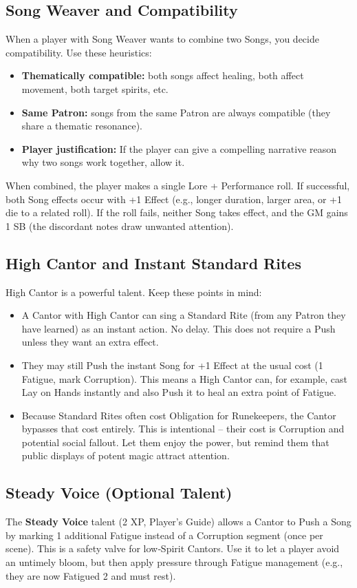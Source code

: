 \subsection*{Song Weaver and Compatibility}
\label{subsec:song-weaver-gm}
When a player with Song Weaver wants to combine two Songs, you decide compatibility. Use these heuristics:
\begin{itemize}
  \item \textbf{Thematically compatible:} both songs affect healing, both affect movement, both target spirits, etc.
  \item \textbf{Same Patron:} songs from the same Patron are always compatible (they share a thematic resonance).
  \item \textbf{Player justification:} If the player can give a compelling narrative reason why two songs work together, allow it.
\end{itemize}
When combined, the player makes a single Lore + Performance roll. If successful, both Song effects occur with +1 Effect (e.g., longer duration, larger area, or +1 die to a related roll). If the roll fails, neither Song takes effect, and the GM gains 1 SB (the discordant notes draw unwanted attention).

\subsection*{High Cantor and Instant Standard Rites}
\label{subsec:high-cantor-gm}
High Cantor is a powerful talent. Keep these points in mind:
\begin{itemize}
  \item A Cantor with High Cantor can sing a Standard Rite (from any Patron they have learned) as an instant action. No delay. This does not require a Push unless they want an extra effect.
  \item They may still Push the instant Song for +1 Effect at the usual cost (1 Fatigue, mark Corruption). This means a High Cantor can, for example, cast Lay on Hands instantly and also Push it to heal an extra point of Fatigue.
  \item Because Standard Rites often cost Obligation for Runekeepers, the Cantor bypasses that cost entirely. This is intentional – their cost is Corruption and potential social fallout. Let them enjoy the power, but remind them that public displays of potent magic attract attention.
\end{itemize}

\subsection*{Steady Voice (Optional Talent)}
\label{subsec:steady-voice-gm}
The \textbf{Steady Voice} talent (2 XP, Player’s Guide) allows a Cantor to Push a Song by marking 1 additional Fatigue instead of a Corruption segment (once per scene). This is a safety valve for low‑Spirit Cantors. Use it to let a player avoid an untimely bloom, but then apply pressure through Fatigue management (e.g., they are now Fatigued 2 and must rest).

